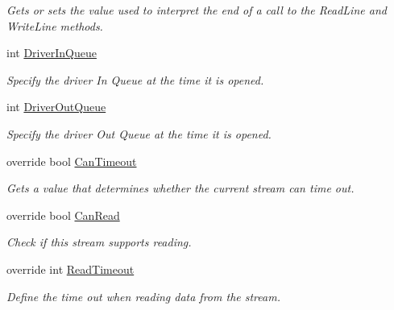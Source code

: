 \begin{DoxyCompactItemize}
\begin{DoxyCompactList}\small\item\em Gets or sets the value used to interpret the end of a call to the Read\+Line and Write\+Line methods. \end{DoxyCompactList}\item 
int \mbox{\hyperlink{class_r_j_c_p_1_1_i_o_1_1_ports_1_1_serial_port_stream_ac19238da373e65d986832efeb335ccb0}{Driver\+In\+Queue}}
\begin{DoxyCompactList}\small\item\em Specify the driver In Queue at the time it is opened. \end{DoxyCompactList}\item 
int \mbox{\hyperlink{class_r_j_c_p_1_1_i_o_1_1_ports_1_1_serial_port_stream_a9cbf475704653f8ebc56d21e9b22aae0}{Driver\+Out\+Queue}}
\begin{DoxyCompactList}\small\item\em Specify the driver Out Queue at the time it is opened. \end{DoxyCompactList}\item 
override bool \mbox{\hyperlink{class_r_j_c_p_1_1_i_o_1_1_ports_1_1_serial_port_stream_a71cc1e2fd25d5365be96dec573cc78be}{Can\+Timeout}}
\begin{DoxyCompactList}\small\item\em Gets a value that determines whether the current stream can time out. \end{DoxyCompactList}\item 
override bool \mbox{\hyperlink{class_r_j_c_p_1_1_i_o_1_1_ports_1_1_serial_port_stream_ac47a4ae0b52510329e52183e8a45eba5}{Can\+Read}}
\begin{DoxyCompactList}\small\item\em Check if this stream supports reading. \end{DoxyCompactList}\item 
override int \mbox{\hyperlink{class_r_j_c_p_1_1_i_o_1_1_ports_1_1_serial_port_stream_a2778ff533ee7133faba41c0d04d4f407}{Read\+Timeout}}
\begin{DoxyCompactList}\small\item\em Define the time out when reading data from the stream. \end{DoxyCompactList}\item 

\end{DoxyCompactItemize}
